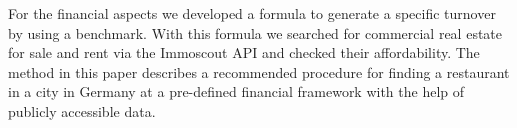 For the financial aspects we developed a formula to generate a specific turnover by using a benchmark. With this formula we searched for commercial real estate for sale and rent via the Immoscout API and checked their affordability.  
The method in this paper describes a recommended procedure for finding a restaurant in a city in Germany at a pre-defined financial framework with the help of publicly accessible data.